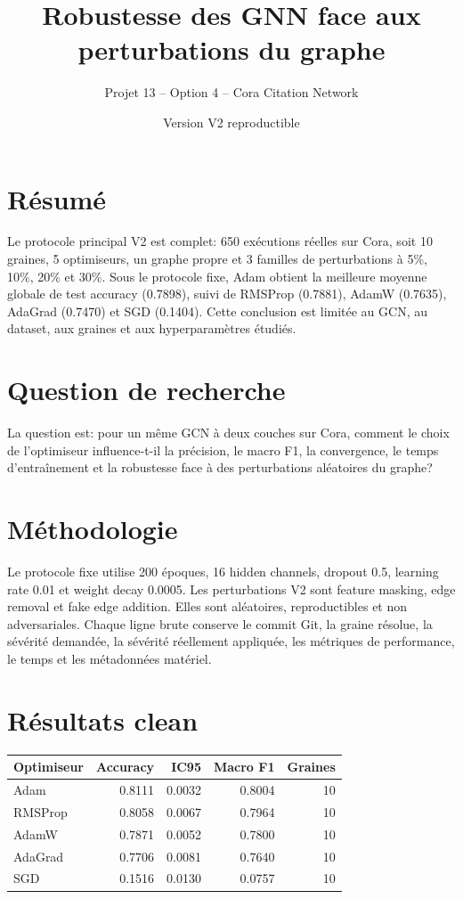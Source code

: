 \documentclass[11pt,a4paper]{article}
\title{Robustesse des GNN face aux perturbations du graphe}
\author{Projet 13 -- Option 4 -- Cora Citation Network}
\date{Version V2 reproductible}
\begin{document}
\maketitle
\tableofcontents
\newpage

\section{Résumé}
Le protocole principal V2 est complet: 650 exécutions réelles sur Cora, soit 10 graines, 5 optimiseurs, un graphe propre et 3 familles de perturbations à 5\%, 10\%, 20\% et 30\%. Sous le protocole fixe, Adam obtient la meilleure moyenne globale de test accuracy (0.7898), suivi de RMSProp (0.7881), AdamW (0.7635), AdaGrad (0.7470) et SGD (0.1404). Cette conclusion est limitée au GCN, au dataset, aux graines et aux hyperparamètres étudiés.

\section{Question de recherche}
La question est: pour un même GCN à deux couches sur Cora, comment le choix de l'optimiseur influence-t-il la précision, le macro F1, la convergence, le temps d'entraînement et la robustesse face à des perturbations aléatoires du graphe?

\section{Méthodologie}
Le protocole fixe utilise 200 époques, 16 hidden channels, dropout 0.5, learning rate 0.01 et weight decay 0.0005. Les perturbations V2 sont feature masking, edge removal et fake edge addition. Elles sont aléatoires, reproductibles et non adversariales. Chaque ligne brute conserve le commit Git, la graine résolue, la sévérité demandée, la sévérité réellement appliquée, les métriques de performance, le temps et les métadonnées matériel.

\section{Résultats clean}
\begin{longtable}{lrrrr}
\toprule
Optimiseur & Accuracy & IC95 & Macro F1 & Graines\\
\midrule
Adam & 0.8111 & 0.0032 & 0.8004 & 10\\
RMSProp & 0.8058 & 0.0067 & 0.7964 & 10\\
AdamW & 0.7871 & 0.0052 & 0.7800 & 10\\
AdaGrad & 0.7706 & 0.0081 & 0.7640 & 10\\
SGD & 0.1516 & 0.0130 & 0.0757 & 10\\
\bottomrule
\end{longtable}
\end{document}
